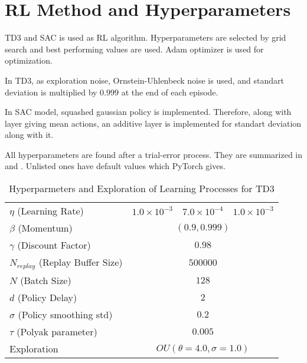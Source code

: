 \section{RL Method and Hyperparameters}
\label{sec:rlmethod}

TD3 and SAC is used as RL algorithm. 
Hyperparameters are selected by grid search and best performing values are used. Adam optimizer is used for optimization. 

In TD3, as exploration noise, Ornstein-Uhlenbeck noise is used, and standart deviation is multiplied  by $0.999$ at the end of each episode. 

In SAC model, squashed gaussian policy is implemented. Therefore, along with layer giving mean actions, an additive layer is implemented for standart deviation along with it. 

All hyperparameters are found after a trial-error process. They  are summarized in  and . Unlisted ones have default values which PyTorch gives. 

\begin{table}
	\begin{tabular}{|l||*{3}{c|}}\hline
		\backslashbox{Hyperparameter}{Model}
		&\makebox[5em]{RFFNN}&\makebox[5em]{LSTM}&\makebox[5em]{Transformer}\\\hline\hline
		$\eta$ (Learning Rate) & $1.0\times10^{-3}$ & $7.0\times10^{-4}$ & $1.0\times10^{-3}$\\\hline
		$\beta$ (Momentum) & \multicolumn{3}{|c|}{$(0.9, 0.999)$}\\\hline
		$\gamma$ (Discount Factor) & \multicolumn{3}{|c|}{$0.98$} \\\hline
		$N_{replay}$ (Replay Buffer Size) &\multicolumn{3}{|c|}{$500000$} \\\hline
		$N$ (Batch Size) &\multicolumn{3}{|c|}{$128$}\\\hline
		$d$ (Policy Delay) &\multicolumn{3}{|c|}{$2$}\\\hline
		$\sigma$ (Policy smoothing std) &\multicolumn{3}{|c|}{$0.2$}\\\hline
		$\tau$ (Polyak parameter) &\multicolumn{3}{|c|}{$0.005$}\\\hline
		Exploration &\multicolumn{3}{|c|}{$OU(\theta=4.0, \sigma=1.0)$}\\\hline
	\end{tabular}
	\caption{Hyperparmeters and Exploration of Learning Processes for TD3}
	\label{table:hyperparams_td3}
\end{table}
\noindent

